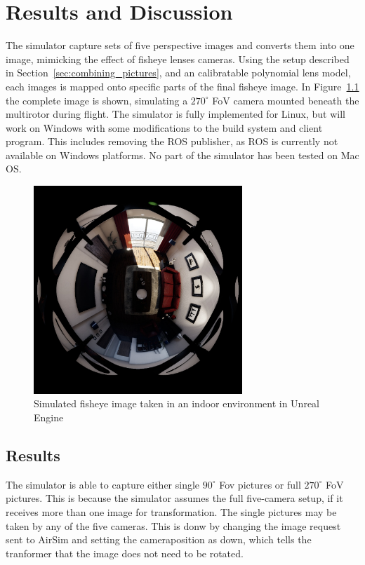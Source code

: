 
\chapter{Results and Discussion}

The simulator capture sets of five perspective images and converts them into one image, mimicking the effect of fisheye lenses cameras. Using the setup described in Section~\ref{sec:combining_pictures}, and an calibratable polynomial lens model, each images is mapped onto specific parts of the final fisheye image. In Figure~\ref{fig:res_show_fisheye} the complete image is shown, simulating a $270^\circ$ FoV camera mounted beneath the multirotor during flight. The simulator is fully implemented for Linux, but will work on Windows with some modifications to the build system and client program. This includes removing the ROS publisher, as ROS is currently not available on Windows platforms. No part of the simulator has been tested on Mac OS. 

\begin{figure}[!htb]
    \centering
    \includegraphics[width=0.7\textwidth]{rapport/fig/Results/1024to1024.jpeg}
    \caption{Simulated fisheye image taken in an indoor environment in Unreal Engine}
    \label{fig:res_show_fisheye}
\end{figure}

\section{Results} \label{sec:Results}

The simulator is able to capture either single $90^\circ$ Fov pictures or full $270^\circ$ FoV pictures. This is because the simulator assumes the full five-camera setup, if it receives more than one image for transformation. The single pictures may be taken by any of the five cameras. This is donw by changing the image request sent to AirSim and setting the cameraposition as down, which tells the tranformer that the image does not need to be rotated.

